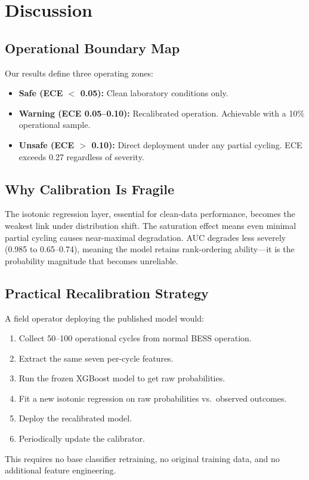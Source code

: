 \documentclass[11pt,a4paper]{article}
\begin{document}
\section{Discussion}

\subsection{Operational Boundary Map}

Our results define three operating zones:
\begin{itemize}
\item \textbf{Safe (ECE $<$ 0.05):} Clean laboratory conditions only.
\item \textbf{Warning (ECE 0.05--0.10):} Recalibrated operation. Achievable with a 10\% operational sample.
\item \textbf{Unsafe (ECE $>$ 0.10):} Direct deployment under any partial cycling. ECE exceeds 0.27 regardless of severity.
\end{itemize}

\subsection{Why Calibration Is Fragile}

The isotonic regression layer, essential for clean-data performance, becomes the weakest link under distribution shift. The saturation effect means even minimal partial cycling causes near-maximal degradation. AUC degrades less severely (0.985 to 0.65--0.74), meaning the model retains rank-ordering ability---it is the probability magnitude that becomes unreliable.

\subsection{Practical Recalibration Strategy}

A field operator deploying the published model would:
\begin{enumerate}
\item Collect 50--100 operational cycles from normal BESS operation.
\item Extract the same seven per-cycle features.
\item Run the frozen XGBoost model to get raw probabilities.
\item Fit a new isotonic regression on raw probabilities vs.\ observed outcomes.
\item Deploy the recalibrated model.
\item Periodically update the calibrator.
\end{enumerate}
This requires no base classifier retraining, no original training data, and no additional feature engineering.
\end{document}

